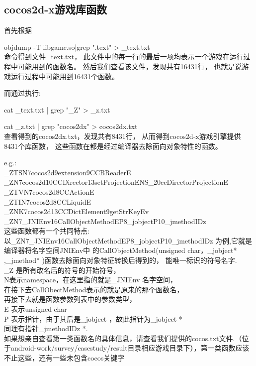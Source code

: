 \subsection{cocos2d-x游戏库函数}
\label{sec:so:cocolib}

首先根据

objdump -T libgame.so|grep ".text" > \_text.txt \\
命令得到文件\_text.txt，
此文件中的每一行的最后一项均表示一个游戏在运行过程中可能用到的函数名。
然后我们查看该文件，发现共有16431行，
也就是说游戏运行过程中可能用到16431个函数。

而通过执行:

cat \_text.txt | grep  "\_Z" > \_z.txt

cat \_z.txt | grep "cocos2dx" > cocos2dx.txt\\
查看得到的cocos2dx.txt，发现共有8431行，
从而得到cocos2d-x游戏引擎提供8431个库函数，
这些函数在都是经过编译器去除面向对象特性的函数。
 
e.g.:\\
      \_ZTSN7cocos2d9extension9CCBReaderE\\
      \_ZN7cocos2d10CCDirector13setProjectionENS\_20ccDirectorProjectionE\\
      \_ZTVN7cocos2d8CCActionE\\
      \_ZTIN7cocos2d8CCLiquidE\\
      \_ZNK7cocos2d13CCDictElement9getStrKeyEv\\
      \_ZN7\_JNIEnv16CallObjectMethodEP8\_jobjectP10\_jmethodIDz\\
这些函数都有一个共同特点:\\
以\_ZN7\_JNIEnv16CallObjectMethodEP8\_jobjectP10\_jmethodIDz 为例,它就是编译器将名字空间JNIEnv中
的CallObjectMethod(unsigned char，\_jobject* ,\_jmethod* )函数去除面向对象特征转换后得到的，
能唯一标识的符号名字.\\
\_Z 是所有改名后的符号的开始符号，\\
N表示namespace，在这里指的就是\_JNIEnv 名字空间，\\
在接下去CallObectMethod表示的就是原来的那个函数名，\\
再接下去就是函数参数列表中的参数类型，\\
E 表示unsigned char\\
P 表示指针，由于其后是\_jobject ，故此指针为\_jobject *\\
同理有指针\_jmethodIDz *.\\
	
如果想亲自查看第一类函数名的具体信息，请查看我们提供的cocos.txt文件.（位于android-work/survey/casestudy/result目录相应游戏目录下），第一类函数应该不止这些，还有一些未包含cocos关键字\\


